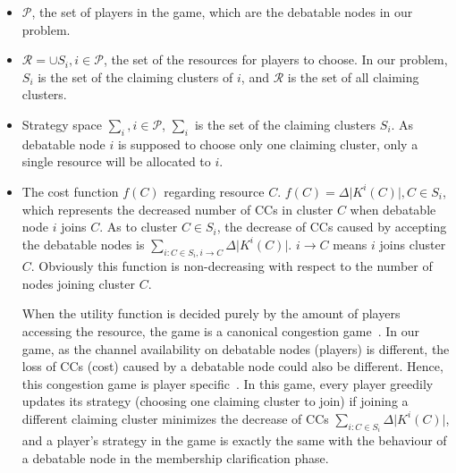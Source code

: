 \documentclass[times]{ettauth}
\theoremstyle{mytheoremstyle}
\theoremstyle{mytheoremstyle}
\theoremstyle{mytheoremstyle}
\begin{document}
\begin{itemize}
	\item $\mathcal{P}$, the set of players in the game, which are the debatable nodes in our problem.
	\item $\mathcal{R} = \cup S_i, i\in \mathcal{P}$, the set of the resources for players to choose. In our problem, $S_i$ is the set of the claiming clusters of $i$, and $\mathcal{R}$ is the set of all claiming clusters.
	\item Strategy space $\sum_i, i \in \mathcal{P}$, $\sum_i$ is the set of the claiming clusters $S_i$.
	As debatable node $i$ is supposed to choose only one claiming cluster, only a single resource will be allocated to $i$.%
	\item 	The cost function $f(C)$ regarding resource $C$. 
	$f(C) = \Delta\vert K^i(C)|, C\in S_i$, which represents the decreased number of CCs in cluster $C$ when debatable node $i$ joins $C$.
	As to cluster $C\in S_i$, the decrease of CCs caused by accepting the debatable nodes is $\sum_{i:C\in S_i, i\rightarrow C} \Delta\vert K^i(C) \vert$. 
$i\rightarrow C$ means $i$ joins cluster $C$.
Obviously this function is non-decreasing with respect to the number of nodes joining cluster $C$.
	
When the utility function is decided purely by the amount of players accessing the resource, the game is a canonical congestion game~\cite{Ackermann06purenash}.
In our game, as the channel availability on debatable nodes (players) is different, the loss of CCs (cost) caused by a debatable node could also be different.
Hence, this congestion game is player specific~\cite{Ackermann06purenash}.
In this game, every player greedily updates its strategy (choosing one claiming cluster to join) if joining a different claiming cluster minimizes the decrease of CCs $\sum_{i:C\in S_i} \Delta\vert K^i(C) \vert$, and a player's strategy in the game is exactly the same with the behaviour of a debatable node in the membership clarification phase.




\end{itemize}
\end{document}
